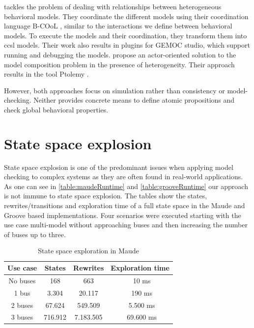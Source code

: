 \documentclass{jot}
\begin{document}
\cite{deantoniModelingBehavioralSemantics2016} tackles the problem of dealing with relationships between heterogeneous behavioral models.
They coordinate the different models using their coordination language B-COoL \cite{varalarsenBCoolBehavioralCoordination2016}, similar to the interactions we define between behavioral models.
To execute the models and their coordination, they transform them into \gls*{ccsl} models.  
Their work also results in plugins for GEMOC studio, which support running and debugging the models.
\cite{ekerTamingHeterogeneityPtolemy2003, leeDisciplinedHeterogeneousModeling2010} propose an actor-oriented solution to the model composition problem in the presence of heterogeneity.
Their approach results in the tool Ptolemy \cite{ptolemaeusSystemDesignModeling2014}.

However, both approaches focus on simulation rather than consistency or model-checking.
Neither provides concrete means to define atomic propositions and check global behavioral properties.

\section{State space explosion}

State space explosion is one of the predominant issues when applying model checking to complex systems as they are often found in real-world applications.
As one can see in \autoref{table:maudeRuntime} and \autoref{table:grooveRuntime} our approach is not immune to state space explosion.
The tables show the states, rewrites/transitions and exploration time of a full state space in the Maude and Groove based implementations.
Four scenarios were executed starting with the use case multi-model without approaching buses and then increasing the number of buses up to three.

\begin{table}
\centering
\begin{tabular}{|c || c | c | c |}
 \hline
 Use case & States & Rewrites & Exploration time \\
 \hline\hline
 No buses & 168 & 663 & ~10 ms \\
 \hline
 1 bus & 3.304 & 20.117 & ~190 ms \\
 \hline
 2 buses & 67.624 & 549.509 & ~5.500 ms \\
 \hline
 3 buses & 716.912 & 7.183.505 & ~69.600 ms \\
 \hline
\end{tabular}
\caption[State space exploration in Maude]{State space exploration in Maude\footnotemark}
\label{table:maudeRuntime}
\end{table}
\end{document}
